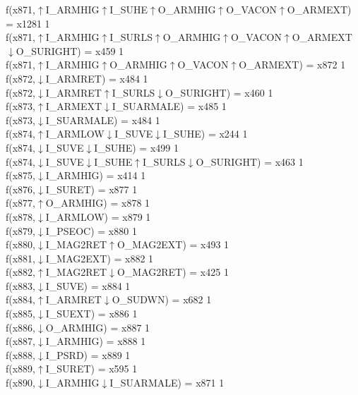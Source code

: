 f(x871,$\uparrow$I\_ARMHIG$\uparrow$I\_SUHE$\uparrow$O\_ARMHIG$\uparrow$O\_VACON$\uparrow$O\_ARMEXT) = x1281 {1} \\
f(x871,$\uparrow$I\_ARMHIG$\uparrow$I\_SURLS$\uparrow$O\_ARMHIG$\uparrow$O\_VACON$\uparrow$O\_ARMEXT$\downarrow$O\_SURIGHT) = x459 {1} \\
f(x871,$\uparrow$I\_ARMHIG$\uparrow$O\_ARMHIG$\uparrow$O\_VACON$\uparrow$O\_ARMEXT) = x872 {1} \\
f(x872,$\downarrow$I\_ARMRET) = x484 {1} \\
f(x872,$\downarrow$I\_ARMRET$\uparrow$I\_SURLS$\downarrow$O\_SURIGHT) = x460 {1} \\
f(x873,$\uparrow$I\_ARMEXT$\downarrow$I\_SUARMALE) = x485 {1} \\
f(x873,$\downarrow$I\_SUARMALE) = x484 {1} \\
f(x874,$\uparrow$I\_ARMLOW$\downarrow$I\_SUVE$\downarrow$I\_SUHE) = x244 {1} \\
f(x874,$\downarrow$I\_SUVE$\downarrow$I\_SUHE) = x499 {1} \\
f(x874,$\downarrow$I\_SUVE$\downarrow$I\_SUHE$\uparrow$I\_SURLS$\downarrow$O\_SURIGHT) = x463 {1} \\
f(x875,$\downarrow$I\_ARMHIG) = x414 {1} \\
f(x876,$\downarrow$I\_SURET) = x877 {1} \\
f(x877,$\uparrow$O\_ARMHIG) = x878 {1} \\
f(x878,$\downarrow$I\_ARMLOW) = x879 {1} \\
f(x879,$\downarrow$I\_PSEOC) = x880 {1} \\
f(x880,$\downarrow$I\_MAG2RET$\uparrow$O\_MAG2EXT) = x493 {1} \\
f(x881,$\downarrow$I\_MAG2EXT) = x882 {1} \\
f(x882,$\uparrow$I\_MAG2RET$\downarrow$O\_MAG2RET) = x425 {1} \\
f(x883,$\downarrow$I\_SUVE) = x884 {1} \\
f(x884,$\uparrow$I\_ARMRET$\downarrow$O\_SUDWN) = x682 {1} \\
f(x885,$\downarrow$I\_SUEXT) = x886 {1} \\
f(x886,$\downarrow$O\_ARMHIG) = x887 {1} \\
f(x887,$\downarrow$I\_ARMHIG) = x888 {1} \\
f(x888,$\downarrow$I\_PSRD) = x889 {1} \\
f(x889,$\uparrow$I\_SURET) = x595 {1} \\
f(x890,$\downarrow$I\_ARMHIG$\downarrow$I\_SUARMALE) = x871 {1} \\
